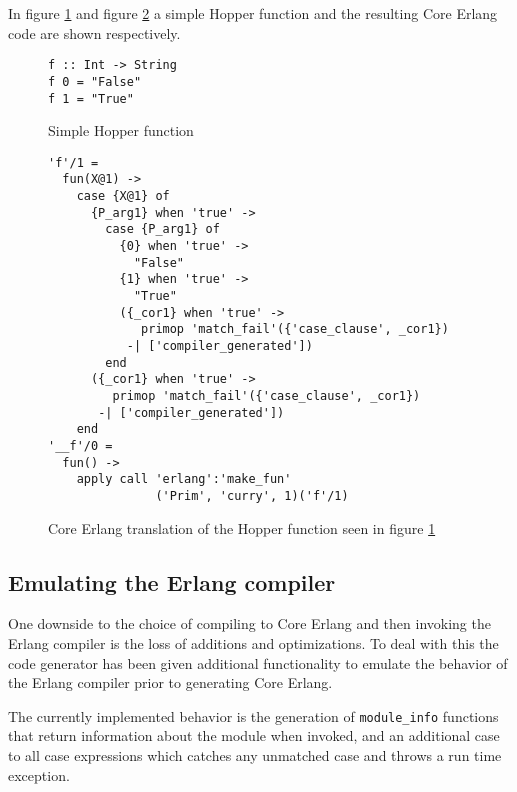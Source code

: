 In figure \ref{lst:hopperFun} and figure \ref{lst:coreFun} a simple Hopper function and the resulting Core Erlang code are shown respectively.

\begin{figure}[!htb]
\centering
\begin{minipage}[b]{0.38\linewidth}
\centering
\begin{lstlisting}
f :: Int -> String
f 0 = "False"
f 1 = "True"
\end{lstlisting}
\end{minipage}
\caption{Simple Hopper function}
\label{lst:hopperFun}
\end{figure}

\begin{figure}[!htb]
\centering
\begin{lstlisting}
'f'/1 =
  fun(X@1) ->
    case {X@1} of
      {P_arg1} when 'true' ->
        case {P_arg1} of
          {0} when 'true' ->
            "False"
          {1} when 'true' ->
            "True"
          ({_cor1} when 'true' ->
             primop 'match_fail'({'case_clause', _cor1})
           -| ['compiler_generated'])
        end
      ({_cor1} when 'true' ->
         primop 'match_fail'({'case_clause', _cor1})
       -| ['compiler_generated'])
    end
'__f'/0 =
  fun() ->
    apply call 'erlang':'make_fun'
               ('Prim', 'curry', 1)('f'/1)
\end{lstlisting}
\caption[Generated Core Erlang translation of function]
 {Core Erlang translation of the Hopper function seen in figure \ref{lst:hopperFun}}
\label{lst:coreFun}
\end{figure}

\subsection{Emulating the Erlang compiler}

One downside to the choice of compiling to Core Erlang and then invoking the Erlang compiler  is the loss of additions and optimizations. To deal with this the code generator has been given additional functionality to emulate the behavior of the Erlang compiler prior to generating Core Erlang. 

The currently implemented behavior is the generation of \texttt{module\_info} functions that return information about the module when invoked, and an additional case to all case expressions which catches any unmatched case and throws a run time exception.
